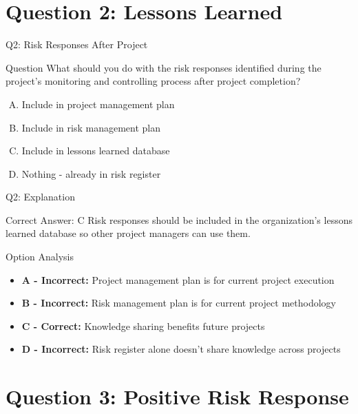 \documentclass{beamer}
\begin{document}
	\section{Question 2: Lessons Learned}
	
	\begin{frame}{Q2: Risk Responses After Project}
		\begin{block}{Question}
			What should you do with the risk responses identified during the project's monitoring and controlling process after project completion?
		\end{block}
		\begin{enumerate}[(A)]
			\item Include in project management plan
			\item Include in risk management plan
			\item Include in lessons learned database
			\item Nothing - already in risk register
		\end{enumerate}
	\end{frame}
	
	\begin{frame}{Q2: Explanation}
		\begin{block}{Correct Answer: C}
			Risk responses should be included in the organization's lessons learned database so other project managers can use them.
		\end{block}
		\begin{block}{Option Analysis}
			\begin{itemize}
				\item \textbf{A - Incorrect:} Project management plan is for current project execution
				\item \textbf{B - Incorrect:} Risk management plan is for current project methodology
				\item \textbf{C - Correct:} Knowledge sharing benefits future projects
				\item \textbf{D - Incorrect:} Risk register alone doesn't share knowledge across projects
			\end{itemize}
		\end{block}
	\end{frame}
	
	\section{Question 3: Positive Risk Response}
	
\end{document}
